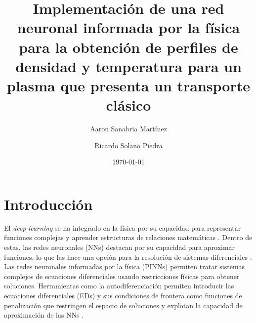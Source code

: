 \title			{Implementación de una red neuronal informada por la física para la obtención de perfiles de densidad y temperatura para un plasma que presenta un transporte clásico}
\author         {Aaron Sanabria Martínez}
\author         {Ricardo Solano Piedra}
\date{\today} %


\maketitle



\section{Introducción} 

El \textit{deep learning} se ha integrado en la física por su capacidad para representar funciones complejas y aprender estructuras de relaciones matemáticas \cite{carleo2019}. Dentro de estas, las redes neuronales (NNs) destacan por su capacidad para aproximar funciones, lo que las hace una opción para la resolución de sistemas diferenciales \cite{lagaris1998}.  Las redes neuronales informadas por la física (PINNs) permiten tratar sistemas complejos de ecuaciones diferenciales usando restricciones físicas para obtener soluciones. Herramientas como la autodiferenciación permiten introducir las ecuaciones diferenciales (EDs) y sus condiciones de frontera como funciones de penalización que restringen el espacio de soluciones y explotan la capacidad de aproximación de las NNs \cite{raissi2019, baydin2018}.

